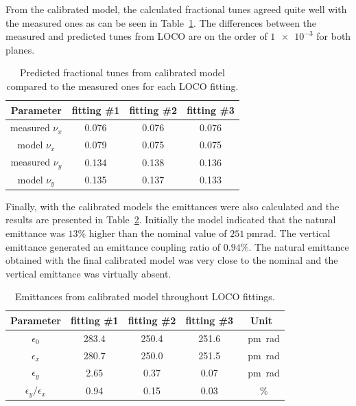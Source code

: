 From the calibrated model, the calculated fractional tunes agreed quite well with the measured ones as can be seen in Table~\ref{tab:calibrated_tunes}. The differences between the measured and predicted tunes from LOCO are on the order of $\num{1e-3}$ for both planes.
\begin{table}
    \centering
    \caption{Predicted fractional tunes from calibrated model compared to the measured ones for each LOCO fitting.}
    \label{tab:calibrated_tunes}
    \begin{tabular}{cccc}
        \toprule\toprule
        Parameter & fitting \#1 & fitting \#2 & fitting \#3 \\
        \hline
        measured $\nu_x$ & \num{0.076} & \num{0.076} & \num{0.076} \\
        model $\nu_x$ & \num{0.079} & \num{0.075} & \num{0.075}  \\
        \hline
        measured $\nu_y$ & \num{0.134} & \num{0.138} & \num{0.136} \\
        model $\nu_y$ & \num{0.135} & \num{0.137} & \num{0.133}  \\
        \bottomrule\bottomrule
    \end{tabular}
\end{table}

Finally, with the calibrated models the emittances were also calculated and the results are presented in Table~\ref{tab:calibrated_emittances}. Initially the model indicated that the natural emittance was $13\%$ higher than the nominal value of $\SI{251}{\pico\meter\radian}$. The vertical emittance generated an emittance coupling ratio of $0.94\%$. The natural emittance obtained with the final calibrated model was very close to the nominal and the vertical emittance was virtually absent.
\begin{table}
    \centering
    \caption{Emittances from calibrated model throughout LOCO fittings.}
    \label{tab:calibrated_emittances}
    \begin{tabular}{ccccc}
        \toprule\toprule
        Parameter & fitting \#1 & fitting \#2 & fitting \#3 & Unit \\
        \hline
        $\epsilon_0$ & \num{283.4} & \num{250.4} & \num{251.6} & \SI{}{\pico\meter\radian}  \\
        $\epsilon_x$ & \num{280.7} & \num{250.0} & \num{251.5} & \SI{}{\pico\meter\radian} \\
        $\epsilon_y$ &  \num{2.65} &  \num{0.37} & \num{0.07} & \SI{}{\pico\meter\radian}  \\
        $\epsilon_y/\epsilon_x$ &  \num{0.94} &  \num{0.15} & \num{0.03} & \SI{}{\%} \\
        \bottomrule\bottomrule
    \end{tabular}
\end{table}

